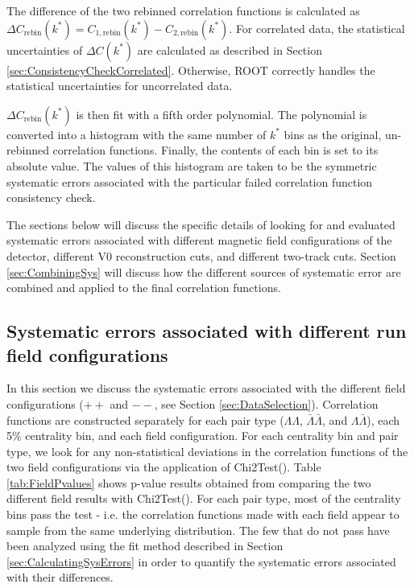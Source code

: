 The difference of the two rebinned correlation functions is calculated as $\Delta C_{\mathrm{rebin}}(k^*) = C_{1,\mathrm{rebin}}(k^*) - C_{2,\mathrm{rebin}}(k^*)$.  For correlated data, the statistical uncertainties of $\Delta C(k^*)$ are calculated as described in Section \ref{sec:ConsistencyCheckCorrelated}.  Otherwise, ROOT correctly handles the statistical uncertainties for uncorrelated data.

$\Delta C_{\mathrm{rebin}}(k^*)$ is then fit with a fifth order polynomial.  The polynomial is converted into a histogram with the same number of $k^*$ bins as the original, un-rebinned correlation functions.  Finally, the contents of each bin is set to its absolute value.  The values of this histogram are taken to be the symmetric systematic errors associated with the particular failed correlation function consistency check.

The sections below will discuss the specific details of looking for and evaluated systematic errors associated with different magnetic field configurations of the detector, different V0 reconstruction cuts, and different two-track cuts. Section \ref{sec:CombiningSys} will discuss how the different sources of systematic error are combined and applied to the final correlation functions.

\subsection{Systematic errors associated with different run field configurations}
\label{sec:SystematicsFieldConfig}

In this section we discuss the systematic errors associated with the different field configurations ($++$ and $--$, see Section \ref{sec:DataSelection}).  Correlation functions are constructed separately for each pair type ($\Lambda\Lambda$, $\bar{\Lambda}\bar{\Lambda}$, and $\Lambda\bar{\Lambda}$), each 5\% centrality bin, and each field configuration.  For each centrality bin and pair type, we look for any non-statistical deviations in the correlation functions of the two field configurations via the application of Chi2Test().  Table \ref{tab:FieldPvalues} shows p-value results obtained from comparing the two different field results with Chi2Test().  For each pair type, most of the centrality bins pass the test - i.e. the correlation functions made with each field appear to sample from the same underlying distribution.  The few that do not pass have been analyzed using the fit method described in Section \ref{sec:CalculatingSysErrors} in order to quantify the systematic errors associated with their differences.  %

